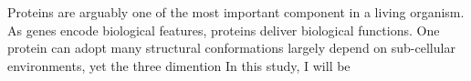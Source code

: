Proteins are arguably one of the most important component in a living organism. As genes encode biological features, proteins deliver biological functions. One protein can adopt many structural conformations largely depend on sub-cellular environments, yet the three dimention     In this study, I will be 